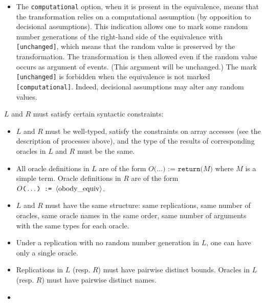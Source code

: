 \begin{itemize}
\begin{itemize}
\item The \texttt{computational} option, when it is present in the 
equivalence, means that the transformation relies on a computational assumption
(by opposition to decisional assumptions). This indication allows one to mark
some random number generations of the right-hand side of the equivalence with
\texttt{[unchanged]}, which means that the random value is preserved by 
the transformation. The transformation is then allowed even if the random 
value occurs as argument of events. (This argument will be unchanged.)
The mark \texttt{[unchanged]} is forbidden when the equivalence is
not marked \texttt{[computational]}. Indeed, decisional assumptions may
alter any random values.

\end{itemize}

$L$ and $R$ must satisfy certain syntactic constraints:
\begin{itemize}

\item %
$L$ and $R$ must be well-typed, satisfy the constraints on
array accesses (see the description of processes above), 
and the type of the results of 
corresponding oracles in $L$ and $R$ must be the same.

\item All oracle definitions in $L$ are of the form 
$O\texttt{(}\ldots\texttt{) := return(}M\texttt{)}$
where $M$ is a simple term. %
Oracle definitions in $R$ are of the form 
$O\texttt{(}\ldots\texttt{) := }\langle\textrm{obody\_equiv}\rangle$.

\item $L$ and $R$ must have the same structure: same replications,
same number of oracles, same oracle names in the same order,
same number of arguments with the same types for each oracle.

\item Under a replication with no random number generation in $L$, 
one can have only a single oracle.

\item Replications in $L$ (resp. $R$) must have pairwise distinct
bounds. Oracles in $L$ (resp. $R$) must have pairwise distinct names.

\item %


\end{itemize}
\end{itemize}
